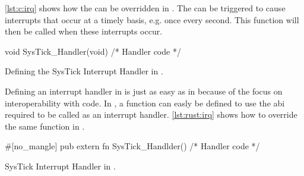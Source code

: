 \autoref{lst:c:irq} shows how the  can be overridden in {\C}.
The {\gecko} can be triggered to cause interrupts that occur at a timely basis, e.g. once every second.
This function will then be called when these interrupts occur.

\begin{listing}[H]
  \begin{ccode}
void SysTick_Handler(void) { /* Handler code */ }
  \end{ccode}
  \caption{Defining the SysTick Interrupt Handler in {\C}.}
  \label{lst:c:irq}
\end{listing}

Defining an interrupt handler in {\rust} is just as easy as in {\C} because of the focus on interoperability with {\C} code.
In {\rust}, a function can easly be defined to use the {\C} \glsdesc{abi} required to be called as an interrupt handler.
\autoref{lst:rust:irq} shows how to override the same  function in {\rust}.

\begin{listing}[H]
  \begin{rustcode}
#[no_mangle] pub extern fn SysTick_Handlder() { /* Handler code */ }
  \end{rustcode}
  \caption{SysTick Interrupt Handler in {\rust}.}
  \label{lst:rust:irq}
\end{listing}
